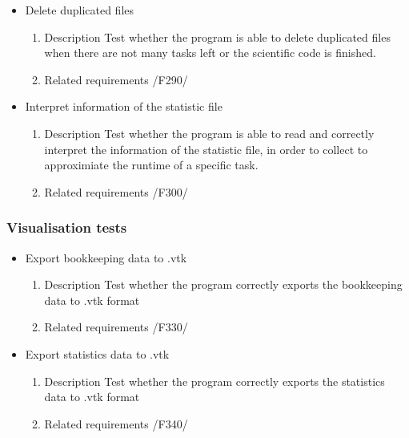{\begin{itemize}
				
				
				\item Delete duplicated files 
				\begin{enumerate}
					\item Description\newline
Test whether the program is able to delete duplicated files when there are not many tasks left or the scientific code is finished.
					\item Related requirements\newline
					/F290/
				\end{enumerate}
				
				
				
				\item Interpret information of the statistic file
				\begin{enumerate}
					\item Description\newline
Test whether the program is able to read and correctly interpret the information of the statistic file, in order to collect to approximiate the runtime of a specific task.
					\item Related requirements\newline
					/F300/
				\end{enumerate}
				
		\end{itemize}		
		\subsubsection{Visualisation tests}
		\begin{itemize}
		
				\item Export bookkeeping data to .vtk
				\begin{enumerate}
					\item Description\newline
Test whether the program correctly exports the bookkeeping data to .vtk format
					\item Related requirements\newline
					/F330/
				\end{enumerate}
				
		
				\item Export statistics data to .vtk
				\begin{enumerate}
					\item Description\newline
Test whether the program correctly exports the statistics data to .vtk format
					\item Related requirements\newline
					/F340/
				\end{enumerate}
				

\end{itemize}}
